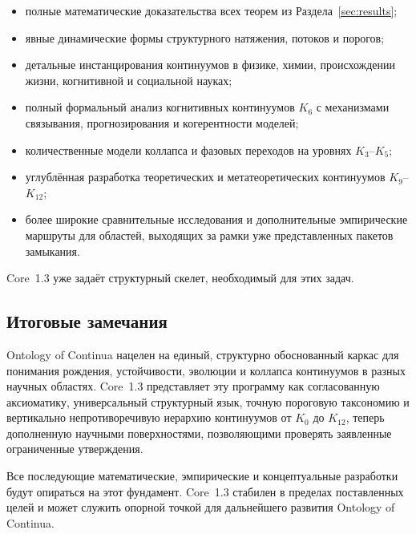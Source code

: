 \begin{itemize}
    \item полные математические доказательства всех теорем из Раздела~\ref{sec:results};
    \item явные динамические формы структурного натяжения, потоков и порогов;
    \item детальные инстанцирования континуумов в физике, химии, происхождении жизни,
          когнитивной и социальной науках;
    \item полный формальный анализ когнитивных континуумов \(K_6\) с механизмами
          связывания, прогнозирования и когерентности моделей;
    \item количественные модели коллапса и фазовых переходов на уровнях \(K_3\)–\(K_5\);
    \item углублённая разработка теоретических и метатеоретических континуумов
          \(K_9\)–\(K_{12}\);
    \item более широкие сравнительные исследования и дополнительные эмпирические
          маршруты для областей, выходящих за рамки уже представленных пакетов замыкания.
\end{itemize}

Core~1.3 уже задаёт структурный скелет, необходимый для этих задач.

\subsection{Итоговые замечания}

Ontology of Continua нацелен на единый, структурно обоснованный
каркас для понимания рождения, устойчивости, эволюции и коллапса континуумов
в разных научных областях.
Core~1.3 представляет эту программу как согласованную аксиоматику, универсальный
структурный язык, точную пороговую таксономию и вертикально непротиворечивую
иерархию континуумов от \(K_0\) до \(K_{12}\), теперь дополненную научными
поверхностями, позволяющими проверять заявленные ограниченные утверждения.

Все последующие математические, эмпирические и концептуальные разработки будут
опираться на этот фундамент.
Core~1.3 стабилен в пределах поставленных целей и может служить опорной точкой
для дальнейшего развития Ontology of Continua.
